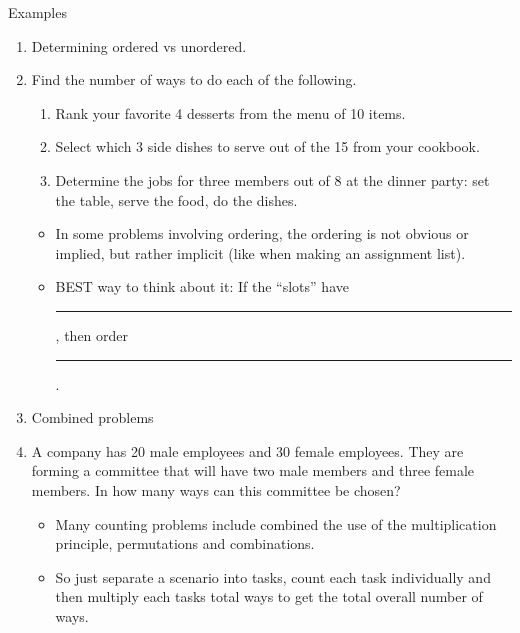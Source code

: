 \documentclass{article}
\newcommand{\blankul}[1]{\rule[-1.5mm]{#1}{0.15mm}}	%
\begin{document}
Examples\bigskip
\begin{enumerate}
   \item Determining ordered vs unordered.
   \item[] Find the number of ways to do each of the following.
    \begin{enumerate}
        \item Rank your favorite 4 desserts from the menu of 10 items.\vspace{40pt}
        \item Select which 3 side dishes to serve out of the 15 from your cookbook.\vspace{40pt}
        \item Determine the jobs for three members out of 8 at the dinner party: set the table, serve the food, do the dishes.\vspace{40pt}
    \end{enumerate}
    \begin{itemize}
        \item In some problems involving ordering, the ordering is not obvious or implied, but rather implicit (like when making an assignment list).
        \item[] BEST way to think about it: If the ``slots'' have \blankul{2cm}, then order \blankul{2cm}.
    \end{itemize}\bigskip
    \item Combined problems
    \item[] A company has 20 male employees and 30 female employees. They are forming a committee that will have two male members and three female members. In how many ways can this committee be chosen?\vspace{140pt}
    \begin{itemize}
        \item Many counting problems include combined the use of the multiplication principle, permutations and combinations.
        \item[] So just separate a scenario into tasks, count each task individually and then multiply each tasks total ways to get the total overall number of ways.
    \end{itemize}
\end{enumerate}\bigskip
\end{document}
